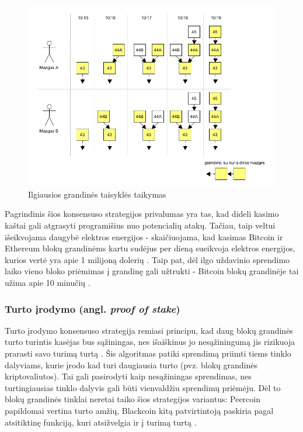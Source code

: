 \begin{figure}[H]
    \centering
    \includegraphics[scale=0.6]{img/blockchainLongestRule}
    \caption{Ilgiausios grandinės taisyklės taikymas}
    \label{fig:blockchainLongestRule}
\end{figure}

Pagrindinis šios konsensuso strategijos privalumas yra tas, kad dideli kasimo kaštai gali atgrasyti programišius nuo potencialių atakų. Tačiau,
taip veltui išeikvojama daugybė elektros energijos - skaičiuojama, kad kasimas Bitcoin ir Ethereum blokų grandinėms kartu sudėjus per dieną
sueikvoja elektros energijos, kurios vertė yra apie 1 milijoną dolerių \cite{Ethereum}. Taip pat, dėl ilgo uždavinio sprendimo laiko vieno bloko priėmimas į grandinę
gali užtrukti - Bitcoin blokų grandinėje tai užima apie 10 minučių \cite{Zheng2017}.

\subsubsection{Turto įrodymo (angl. \textit{proof of stake})}

Turto įrodymo konsensuso strategija remiasi principu, kad daug blokų grandinės turto turintis kasėjas
bus sąžiningas, nes išaiškinus jo nesąžiningumą jis rizikuoja prarasti savo turimą turtą \cite{Baars2016}. Šis algoritmas patiki sprendimą priimti
tiems tinklo dalyviams, kurie įrodo kad turi daugiausia turto (pvz. blokų grandinės kriptovaliutos). Tai gali pasirodyti kaip nesąžiningas sprendimas,
nes turtingiausias tinklo dalyvis gali būti vienvaldžiu sprendimų priėmėju. Dėl to blokų grandinės tinklai neretai taiko šios strategijos
variantus: Peercoin papildomai vertina turto amžių, Blackcoin kitą patvirtintoją paskiria pagal atsitiktinę funkciją, kuri atsižvelgia ir į turimą turtą \cite{Zheng2017}.

